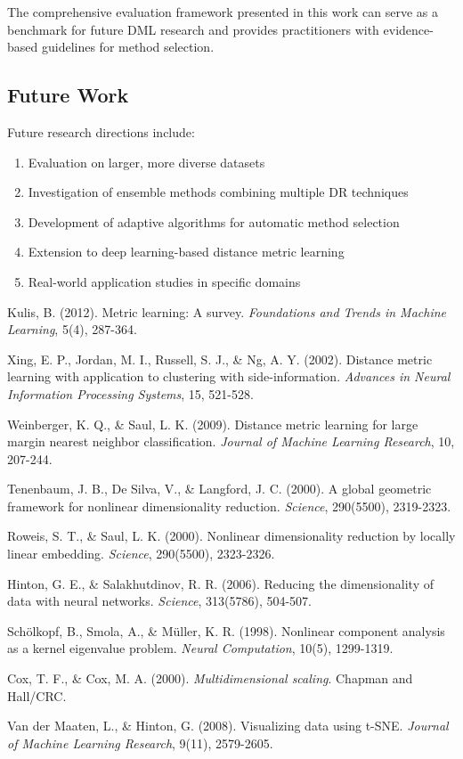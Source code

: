 \documentclass[12pt,a4paper]{article}
\begin{document}
The comprehensive evaluation framework presented in this work can serve as a benchmark for future DML research and provides practitioners with evidence-based guidelines for method selection.

\subsection{Future Work}

Future research directions include:
\begin{enumerate}
    \item Evaluation on larger, more diverse datasets
    \item Investigation of ensemble methods combining multiple DR techniques
    \item Development of adaptive algorithms for automatic method selection
    \item Extension to deep learning-based distance metric learning
    \item Real-world application studies in specific domains
\end{enumerate}


\begin{thebibliography}{9}

Kulis, B. (2012). Metric learning: A survey. \emph{Foundations and Trends in Machine Learning}, 5(4), 287-364.

Xing, E. P., Jordan, M. I., Russell, S. J., \& Ng, A. Y. (2002). Distance metric learning with application to clustering with side-information. \emph{Advances in Neural Information Processing Systems}, 15, 521-528.

Weinberger, K. Q., \& Saul, L. K. (2009). Distance metric learning for large margin nearest neighbor classification. \emph{Journal of Machine Learning Research}, 10, 207-244.

Tenenbaum, J. B., De Silva, V., \& Langford, J. C. (2000). A global geometric framework for nonlinear dimensionality reduction. \emph{Science}, 290(5500), 2319-2323.

Roweis, S. T., \& Saul, L. K. (2000). Nonlinear dimensionality reduction by locally linear embedding. \emph{Science}, 290(5500), 2323-2326.

Hinton, G. E., \& Salakhutdinov, R. R. (2006). Reducing the dimensionality of data with neural networks. \emph{Science}, 313(5786), 504-507.

Schölkopf, B., Smola, A., \& Müller, K. R. (1998). Nonlinear component analysis as a kernel eigenvalue problem. \emph{Neural Computation}, 10(5), 1299-1319.

Cox, T. F., \& Cox, M. A. (2000). \emph{Multidimensional scaling}. Chapman and Hall/CRC.

Van der Maaten, L., \& Hinton, G. (2008). Visualizing data using t-SNE. \emph{Journal of Machine Learning Research}, 9(11), 2579-2605.

\end{thebibliography}
\end{document}
